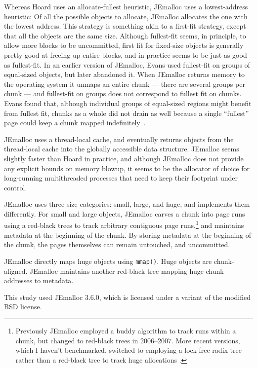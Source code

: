 \documentclass[natbib,sort&compress,10pt]{sigplanconf}
\newcommand{\code}[1]{\texttt{#1}}
\begin{document}
Whereas Hoard uses an allocate-fullest heuristic, JEmalloc uses a
lowest-address heuristic: Of all the possible objects to allocate,
JEmalloc allocates the one with the lowest address.  This strategy is
something akin to a first-fit strategy, except that all the objects
are the same size.  Although fullest-fit seems, in principle, to allow
more blocks to be uncommitted, first fit for fixed-size objects is
generally pretty good at freeing up entire blocks, and in practice
seems to be just as good as fullest-fit.  In an earlier version of
JEmalloc, Evans used fullest-fit on groups of equal-sized objects, but
later abandoned it.  When JEmalloc returns memory to the operating
system it unmaps an entire chunk --- there are several groups per
chunk --- and fullest-fit on groups does not correspond to fullest fit
on chunks. Evans found that, although individual groups of equal-sized
regions might benefit from fullest fit, chunks as a whole did not
drain as well because a single ``fullest'' page could keep a chunk
mapped indefinitely~\cite{Evans15-personal-communication}.  

JEmalloc uses a thread-local cache, and eventually returns objects
from the thread-local cache into the globally accessible data
structure.  JEmalloc seems slightly faster than Hoard in practice, and
although JEmalloc does not provide any explicit bounds on memory
blowup, it seems to be the allocator of choice for long-running
multithreaded processes that need to keep their footprint under
control.

JEmalloc uses three size categories: small, large, and huge, and
implements them differently. For small and large objects, JEmalloc
carves a chunk into page runs using a red-black trees to track
arbitrary contiguous page runs,\footnote{Previously JEmalloc employed
  a buddy algorithm to track runs within a chunk, but changed to
  red-black trees in 2006--2007.  More recent versions, which I
  haven't benchmarked, switched to employing a lock-free radix tree
  rather than a red-black tree to track huge allocations
  \cite{Evans15-personal-communication}.} and maintains metadata at
the beginning of the chunk.  By storing metadata at the beginning of
the chunk, the pages themselves can remain untouched, and uncommitted.

JEmalloc directly maps huge objects using \code{mmap()}.  Huge objects
are chunk-aligned.  JEmalloc maintains another red-black tree mapping
huge chunk addresses to metadata.

This study used JEmalloc 3.6.0, which is licensed under a variant of the
modified BSD license.
\end{document}
